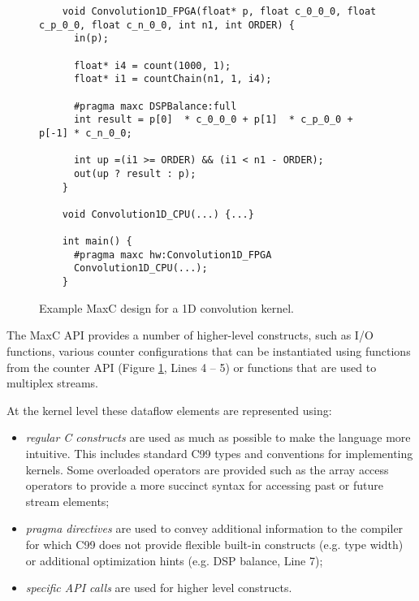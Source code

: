 \lstset{style=MaxC}

\begin{figure}[!h]
  \begin{lstlisting}
    void Convolution1D_FPGA(float* p, float c_0_0_0, float c_p_0_0, float c_n_0_0, int n1, int ORDER) {
      in(p);

      float* i4 = count(1000, 1);
      float* i1 = countChain(n1, 1, i4);

      #pragma maxc DSPBalance:full
      int result = p[0]  * c_0_0_0 + p[1]  * c_p_0_0 + p[-1] * c_n_0_0;

      int up =(i1 >= ORDER) && (i1 < n1 - ORDER);
      out(up ? result : p);
    }

    void Convolution1D_CPU(...) {...}

    int main() {
      #pragma maxc hw:Convolution1D_FPGA
      Convolution1D_CPU(...);
    }
  \end{lstlisting}
  \caption{Example MaxC design for a 1D convolution kernel.}
  \label{fig:maxc-1dconv}
\end{figure}


The MaxC API provides a number of higher-level constructs, such as I/O
functions, various counter configurations that can be instantiated
using functions from the counter API (Figure \ref{fig:maxc-1dconv},
Lines 4 -- 5) or functions that are used to multiplex streams.

At the kernel level these dataflow elements are represented using:

\begin{itemize}
\item \emph{regular C constructs} are used as much as possible to make
  the language more intuitive. This includes standard C99 types and
  conventions for implementing kernels. Some overloaded operators are
  provided such as the array access operators to provide a more
  succinct syntax for accessing past or future stream elements;

\item \emph{pragma directives} are used to convey additional
  information to the compiler for which C99 does not provide flexible
  built-in constructs (e.g. type width) or additional optimization
  hints (e.g. DSP balance, Line 7);

\item \emph{specific API calls} are used for higher level constructs.

\end{itemize}
